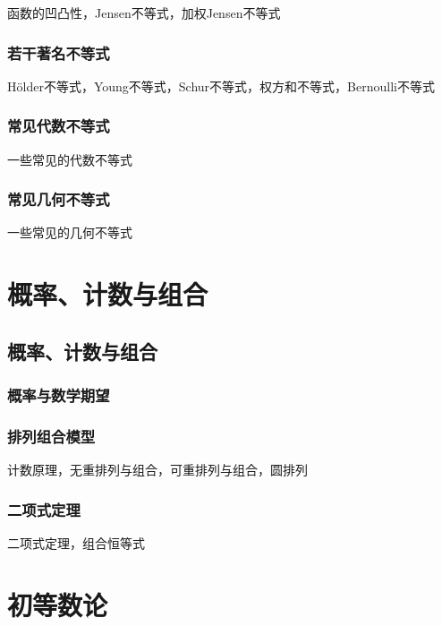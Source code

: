 \documentclass[lang=cn, zihao=5]{elegantbook}
\begin{document}
函数的凹凸性，Jensen不等式，加权Jensen不等式

\section{若干著名不等式}

Hölder不等式，Young不等式，Schur不等式，权方和不等式，Bernoulli不等式

\section{常见代数不等式}

一些常见的代数不等式

\section{常见几何不等式}

一些常见的几何不等式

\part{概率、计数与组合}

\chapter{概率、计数与组合}

\section{概率与数学期望}

\section{排列组合模型}

计数原理，无重排列与组合，可重排列与组合，圆排列

\section{二项式定理}

二项式定理，组合恒等式

\part{初等数论}
\end{document}
